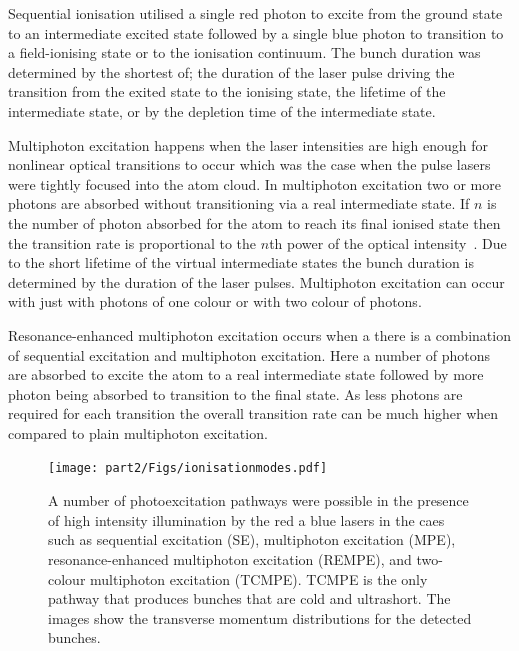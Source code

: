 Sequential ionisation utilised a single red photon to excite from the ground state to an intermediate excited state followed by a single blue photon to transition to a field-ionising state or to the ionisation continuum.
The bunch duration was determined by the shortest of; the duration of the laser pulse driving the transition from the exited state to the ionising state, the lifetime of the intermediate state, or by the depletion time of the intermediate state.

Multiphoton excitation happens when the laser intensities are high enough for nonlinear optical transitions to occur which was the case when the pulse lasers were tightly focused into the atom cloud.
In multiphoton excitation two or more photons are absorbed without transitioning via a real intermediate state.
If $n$ is the number of photon absorbed for the atom to reach its final ionised state then the transition rate is proportional to the $n$th power of the optical intensity~\cite{joachain_atoms_2011}.
Due to the short lifetime of the virtual intermediate states the bunch duration is determined by the duration of the laser pulses.
Multiphoton excitation can occur with just with photons of one colour or with two colour of photons.

Resonance-enhanced multiphoton excitation occurs when a there is a combination of sequential excitation and multiphoton excitation.
Here a number of photons are absorbed to excite the atom to a real intermediate state followed by more photon being absorbed to transition to the final state.
As less photons are required for each transition the overall transition rate can be much higher when compared to plain multiphoton excitation.

\begin{figure}
    \center
    \texttt{[image: part2/Figs/ionisationmodes.pdf]}
    \caption[Photoexcitation pathways.]{A number of photoexcitation pathways were possible in the presence of high intensity illumination by the red a blue lasers in the \gls{caes} such as sequential excitation (SE), multiphoton excitation (MPE), resonance-enhanced multiphoton excitation (REMPE), and two-colour multiphoton excitation (TCMPE). TCMPE is the only pathway that produces bunches that are cold and ultrashort. The images show the transverse momentum distributions for the detected bunches.}
    \label{figure:ionisation_modes}
\end{figure}


